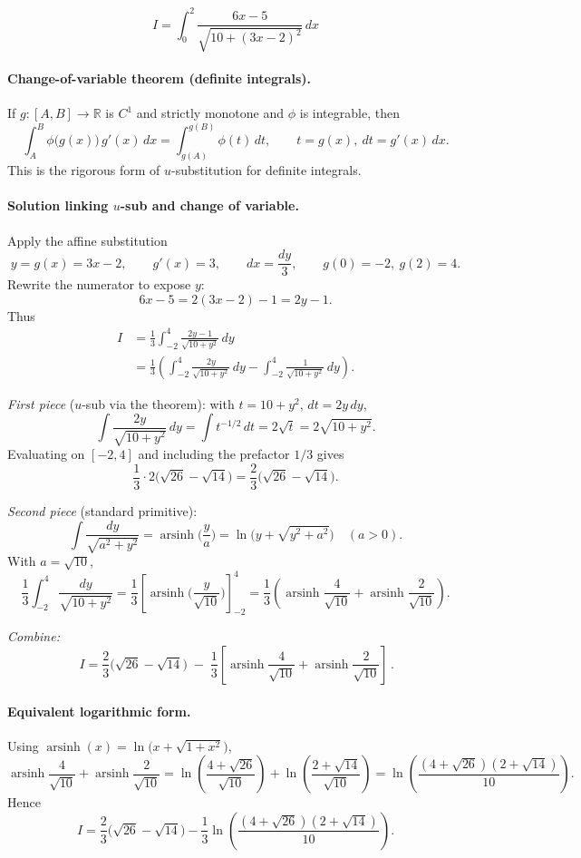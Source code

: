 \documentclass[12pt]{article}
\begin{document}
\[
I=\int_{0}^{2}\frac{6x-5}{\sqrt{10+(3x-2)^{2}}}\,dx
\]

\paragraph{Change-of-variable theorem (definite integrals).}
If $g:[A,B]\to\mathbb{R}$ is $C^1$ and strictly monotone and $\phi$ is integrable, then
\[
\int_{A}^{B}\phi\!\big(g(x)\big)\,g'(x)\,dx
=\int_{g(A)}^{g(B)}\phi(t)\,dt,
\qquad t=g(x),\ dt=g'(x)\,dx.
\]
This is the rigorous form of $u$-substitution for definite integrals.

\paragraph{Solution linking $u$-sub and change of variable.}
Apply the affine substitution
\[
y=g(x)=3x-2,\qquad g'(x)=3,\qquad dx=\frac{dy}{3},\qquad g(0)=-2,\ g(2)=4.
\]
Rewrite the numerator to expose $y$:
\[
6x-5=2(3x-2)-1=2y-1.
\]
Thus
\begin{align*}
I
&=\frac{1}{3}\int_{-2}^{4}\frac{2y-1}{\sqrt{10+y^{2}}}\,dy
\\
&=\frac{1}{3}\left(\int_{-2}^{4}\frac{2y}{\sqrt{10+y^{2}}}\,dy
-\int_{-2}^{4}\frac{1}{\sqrt{10+y^{2}}}\,dy\right).
\end{align*}

\emph{First piece} ($u$-sub via the theorem): with $t=10+y^{2}$, $dt=2y\,dy$,
\[
\int \frac{2y}{\sqrt{10+y^{2}}}\,dy=\int t^{-1/2}\,dt=2\sqrt{t}=2\sqrt{10+y^{2}}.
\]
Evaluating on $[-2,4]$ and including the prefactor $1/3$ gives
\[
\frac{1}{3}\cdot 2\big(\sqrt{26}-\sqrt{14}\big)=\frac{2}{3}\big(\sqrt{26}-\sqrt{14}\big).
\]

\emph{Second piece} (standard primitive):
\[
\int\frac{dy}{\sqrt{a^{2}+y^{2}}}=\operatorname{arsinh}\!\Big(\frac{y}{a}\Big)
=\ln\!\Big(y+\sqrt{y^{2}+a^{2}}\Big)\quad(a>0).
\]
With $a=\sqrt{10}$,
\[
\frac{1}{3}\int_{-2}^{4}\frac{dy}{\sqrt{10+y^{2}}}
=\frac{1}{3}\left[\operatorname{arsinh}\!\Big(\frac{y}{\sqrt{10}}\Big)\right]_{-2}^{4}
=\frac{1}{3}\left(\operatorname{arsinh}\!\frac{4}{\sqrt{10}}+\operatorname{arsinh}\!\frac{2}{\sqrt{10}}\right).
\]

\emph{Combine:}
\[
\boxed{\,I=\frac{2}{3}\big(\sqrt{26}-\sqrt{14}\big)\;-\;\frac{1}{3}\!\left[\operatorname{arsinh}\!\frac{4}{\sqrt{10}}+\operatorname{arsinh}\!\frac{2}{\sqrt{10}}\right]\, }.
\]

\paragraph{Equivalent logarithmic form.}
Using $\operatorname{arsinh}(x)=\ln\!\big(x+\sqrt{1+x^{2}}\big)$,
\[
\operatorname{arsinh}\!\frac{4}{\sqrt{10}}+\operatorname{arsinh}\!\frac{2}{\sqrt{10}}
=\ln\!\left(\frac{4+\sqrt{26}}{\sqrt{10}}\right)+\ln\!\left(\frac{2+\sqrt{14}}{\sqrt{10}}\right)
=\ln\!\left(\frac{(4+\sqrt{26})(2+\sqrt{14})}{10}\right).
\]
Hence
\[
I=\frac{2}{3}\big(\sqrt{26}-\sqrt{14}\big)
-\frac{1}{3}\ln\!\left(\frac{(4+\sqrt{26})(2+\sqrt{14})}{10}\right).
\]
\end{document}
